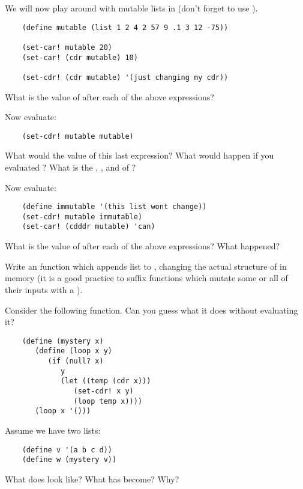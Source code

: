 \documentclass{../../../tp}
\begin{document}
\begin{instruction}
	We will now play around with mutable lists in \scheme (don't forget to use ).

	\begin{verbatim}
	(define mutable (list 1 2 4 2 57 9 .1 3 12 -75))

	(set-car! mutable 20)
	(set-car! (cdr mutable) 10)
	
	(set-cdr! (cdr mutable) '(just changing my cdr))
	 \end{verbatim}
	 
	What is the value of  after each of the above expressions?
	
	Now evaluate:
	\begin{verbatim}
	(set-cdr! mutable mutable)
	 \end{verbatim}

	What would the value of this last expression? What would happen if you evaluated ? What is the , ,  and  of ?
	
	Now evaluate:
	\begin{verbatim}	
	(define immutable '(this list wont change))
	(set-cdr! mutable immutable)
	(set-car! (cdddr mutable) 'can)
	 \end{verbatim}
	 
	 What is the value of  after each of the above expressions? What happened? 	
\end{instruction}

\begin{instruction}
	Write an  function which appends list  to , changing the actual structure of  in memory (it is a good \scheme practice to suffix functions which mutate some or all of their inputs with a \schemecode{!}).  
\end{instruction}


\begin{instruction}
	
	Consider the following  function. Can you guess what it does without evaluating it? 
	
	\begin{verbatim}
	(define (mystery x)
	   (define (loop x y)
	      (if (null? x)
	         y
	         (let ((temp (cdr x)))
	            (set-cdr! x y)
	            (loop temp x))))
	   (loop x '()))
	\end{verbatim}
	
	Assume we have two lists:
	
	\begin{verbatim}
	(define v '(a b c d))
	(define w (mystery v))
	\end{verbatim}
	
	What does  look like? What has  become? Why?
	
\end{instruction}
\end{document}
